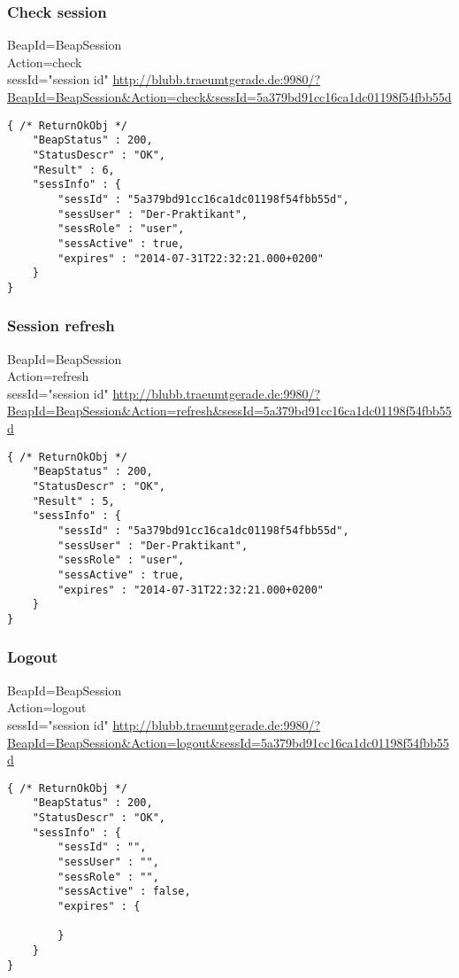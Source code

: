 \documentclass[12pt,a4paper,oneside]{report}
\begin{document}
\subsubsection{Check session}
BeapId=BeapSession\\
Action=check\\
sessId="session id"
\url{http://blubb.traeumtgerade.de:9980/?BeapId=BeapSession&Action=check&sessId=5a379bd91cc16ca1dc01198f54fbb55d}
\lstset{language=JavaScript}
\begin{lstlisting}
{ /* ReturnOkObj */
    "BeapStatus" : 200,
    "StatusDescr" : "OK",
    "Result" : 6,
    "sessInfo" : { 
        "sessId" : "5a379bd91cc16ca1dc01198f54fbb55d",
        "sessUser" : "Der-Praktikant",
        "sessRole" : "user",
        "sessActive" : true,
        "expires" : "2014-07-31T22:32:21.000+0200"
    }
}
\end{lstlisting}

\subsubsection{Session refresh}

BeapId=BeapSession\\
Action=refresh\\
sessId="session id"
\url{http://blubb.traeumtgerade.de:9980/?BeapId=BeapSession&Action=refresh&sessId=5a379bd91cc16ca1dc01198f54fbb55d}
\lstset{language=JavaScript}
\begin{lstlisting}
{ /* ReturnOkObj */
    "BeapStatus" : 200,
    "StatusDescr" : "OK",
    "Result" : 5,
    "sessInfo" : { 
        "sessId" : "5a379bd91cc16ca1dc01198f54fbb55d",
        "sessUser" : "Der-Praktikant",
        "sessRole" : "user",
        "sessActive" : true,
        "expires" : "2014-07-31T22:32:21.000+0200"
    }
}
\end{lstlisting}

\subsubsection{Logout}

BeapId=BeapSession\\
Action=logout\\
sessId="session id"
\url{http://blubb.traeumtgerade.de:9980/?BeapId=BeapSession&Action=logout&sessId=5a379bd91cc16ca1dc01198f54fbb55d}
\lstset{language=JavaScript}
\begin{lstlisting}
{ /* ReturnOkObj */
    "BeapStatus" : 200,
    "StatusDescr" : "OK",
    "sessInfo" : { 
        "sessId" : "",
        "sessUser" : "",
        "sessRole" : "",
        "sessActive" : false,
        "expires" : { 

        }
    }
}
\end{lstlisting}
\end{document}
